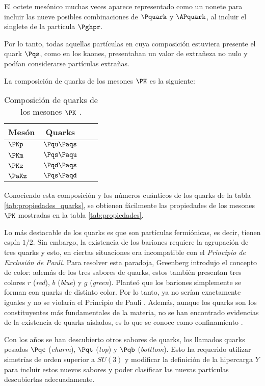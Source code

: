 El octete mesónico muchas veces aparece representado como un nonete para incluir las nueve posibles combinaciones de $\Pquark$ y $\APquark$, al incluir el singlete de la partícula $\Pghpr$.

Por lo tanto, todas aquellas partículas en cuya composición estuviera presente el quark $\Pqs$, como en los kaones, presentaban un valor de extrañeza no nulo y podían considerarse partículas extrañas. 

La composición de quarks de los mesones $\PK$ es la siguiente:

\begin{table}[h!]
	\centering
	\begin{tabular}{l*{2}{c}r}
\hline
Mesón & Quarks\\ 
\hline
$\PKp$ & $\Pqu\Paqs$\\
$\PKm$ & $\Pqs\Paqu$\\
$\PKz$ & $\Pqd\Paqs$\\
$\PaKz$ & $\Pqs\Paqd$\\
\hline
	\end{tabular}
\caption[Composición de quarks de los mesones $\PK$]{Composición de quarks de los mesones $\PK$ \cite{notas2020}.} 
\label{tab:mesonesK_quarks}
\end{table}

Conociendo esta composición y los números cuánticos de los quarks de la tabla \ref{tab:propiedades_quarks}, se obtienen fácilmente las propiedades de los mesones $\PK$ mostradas en la tabla \ref{tab:propiedades}.

Lo más destacable de los quarks es que son partículas fermiónicas, es decir, tienen espín $1/2$. Sin embargo, la existencia de los bariones requiere la agrupación de tres quarks y esto, en ciertas situaciones era incompatible con el \textit{Principio de Exclusión de Pauli}. Para resolver esta paradoja, Greenberg introdujo el concepto de color: además de los tres sabores de quarks, estos también presentan tres colores $r$ (\textit{red}), $b$ (\textit{blue}) y $g$ (\textit{green}). Planteó que los bariones simplemente se forman con quarks de distinto color. Por lo tanto, ya no serían exactamente iguales y no se violaría el Principio de Pauli \cite{Griffiths2008}. Además, aunque los quarks son los constituyentes más fundamentales de la materia, no se han encontrado evidencias de la existencia de quarks aislados, es lo que se conoce como confinamiento \cite{Pais}.

Con los años se han descubierto otros sabores de quarks, los llamados quarks pesados $\Pqc$ (\textit{charm}), $\Pqt$ (\textit{top}) y $\Pqb$ (\textit{botttom}). Esto ha requerido utilizar simetrías de orden superior a $SU(3)$ y modificar la definición de la hipercarga $Y$ para incluir estos nuevos sabores y poder clasificar las nuevas partículas descubiertas adecuadamente.

